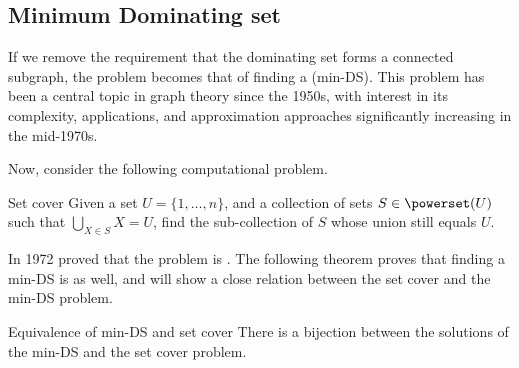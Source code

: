 \documentclass[a4paper, 12pt]{report}
\begin{document}
    \subsection{Minimum Dominating set}

    If we remove the requirement that the dominating set forms a connected subgraph, the problem becomes that of finding a  (min-DS). This problem has been a central topic in graph theory since the 1950s, with interest in its complexity, applications, and approximation approaches significantly increasing in the mid-1970s.

    Now, consider the following computational problem.

    \begin{frameddefn}{Set cover}
        Given a  set $U = \{1, \ldots, n\}$, and a collection of sets $S \in \powerset(U)$ such that $\bigcup_{X \in S}{X} = U$, find the  sub-collection of $S$ whose union still equals $U$.
    \end{frameddefn}

    In 1972 \textcite{karp} proved that the  problem is \NPComplete. The following theorem proves that finding a min-DS is \NPComplete as well, and will show a close relation between the set cover and the min-DS problem.

    \begin{framedthm}{Equivalence of min-DS and set cover}
        There is a bijection between the solutions of the min-DS and the set cover problem.
    \end{framedthm}
\end{document}
